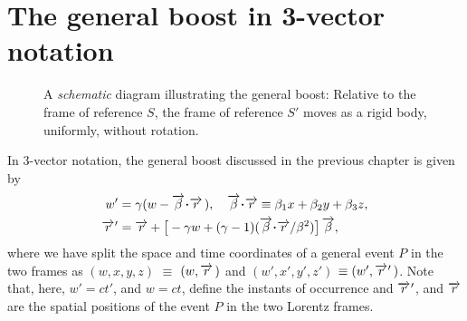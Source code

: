 \section{The general boost in 3-vector  notation}
\begin{figure}[H]
\begin{center}
\end{center}
\caption{A \textsl{schematic} diagram illustrating the 
general boost: Relative to the frame of reference $S$, 
the 
frame of reference $S'$ moves as a rigid body, 
uniformly, 
without rotation.} \label{fig6.1}
\end{figure}

In 3-vector notation, the {general boost} discussed in 
the
previous chapter is given by
\begin{align}\label{pmadd3}
w'&=\gkg(w-\veca{\gkb}\dotp\veca{r}\, ),\quad
\veca{\gkb}\dotp\veca{r} \equiv \gkb_1 x+\gkb_2 
y+\gkb_3 
z,\\
\pvec{r} & =\veca{r} + \big[-\gkg 
w+(\gkg-1)(\veca{\gkb}\dotp
\veca{r}/\gkb^2) \big] \,\veca{\gkb}, \label{pmadd4}
\end{align}
where  we have split the space and time coordinates of 
a 
general event $P$ in the two frames as $(w,x,y,z)$ 
$\equiv$ 
$(w,\overrightarrow{r}\,)$ and $(w' ,x' ,y' ,z' )$ $\equiv 
(w',{\overrightarrow{r}\hspace*{.3pt}'}\,)$. Note that, here, $w'=ct'$, and $w 
=ct$, 
define the instants of occurrence  and  ${\overrightarrow{r}\hspace*{.3pt}'}$, 
and 
$\overrightarrow{r}$ are the spatial positions  of the event $P$ 
in 
the 
two Lorentz frames.

